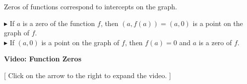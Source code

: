 \documentclass{ximera}
\begin{document}
Zeros of functions correspond to intercepts on the graph.



$\blacktriangleright$ If $a$ is a zero of the function $f$, then $(a, f(a)) = (a, 0)$ is a point on the graph of $f$. \\


$\blacktriangleright$ If $(a, 0)$ is a point on the graph of $f$, then $f(a) = 0$ and $a$ is a zero of $f$.











\begin{explanation} \textbf{Video: Function Zeros}

[ Click on the arrow to the right to expand the video. ]
\begin{expandable} 

\begin{center}
\end{center}

\end{expandable}
\end{explanation}
\end{document}
